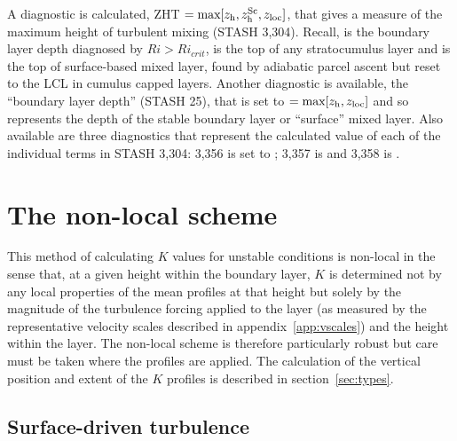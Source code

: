 \documentclass{UMDP_article}
\begin{document}
A diagnostic is calculated, ZHT $=\mbox{max}[z_{\rm h}, z_{\rm h}^{\rm Sc}, z_{\rm loc}]$,
that gives a measure of the maximum height of turbulent mixing (STASH
3,304).  Recall, \zloc is the boundary layer depth diagnosed by $Ri >
Ri_{crit}$, \zhsc is the top of any stratocumulus layer and \zh is the
top of surface-based mixed layer, found by adiabatic parcel ascent but
reset to the LCL in cumulus capped layers.  Another diagnostic is
available, the ``boundary layer depth'' (STASH 25), that is set to
$=\mbox{max}[z_{\rm h}, z_{\rm loc}]$ and so represents the depth of the stable
boundary layer or ``surface'' mixed layer.  Also available are three
diagnostics that represent the calculated value of each of the
individual terms in STASH 3,304: 3,356 is set to \zh; 3,357 is \zhsc
and 3,358 is \zloc.

\section{The non-local scheme}
\label{sec:nonlocal}

This method of calculating $K$ values for unstable conditions is
non-local in the sense that, at a given height within the boundary
layer, $K$ is determined not by any local properties of the mean
profiles at that height but solely by the magnitude of the turbulence
forcing applied to the layer (as measured by the representative
velocity scales described in appendix~\ref{app:vscales}) and the
height within the layer.  The non-local scheme is therefore
particularly robust but care must be taken where the profiles are
applied.  The calculation of the vertical position and extent of the
$K$ profiles is described in section~\ref{sec:types}.

\subsection{Surface-driven turbulence}
\label{sec:nlsurf}
\end{document}
